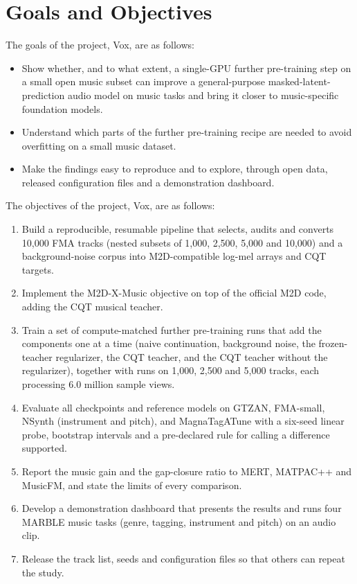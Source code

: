 \documentclass{FastFyp}
\begin{document}
\section{Goals and Objectives}
\label{sec:vision-goals}
The goals of the project, Vox, are as follows:
\begin{itemize}
  \item Show whether, and to what extent, a single-GPU further pre-training step on a small open music subset can improve a general-purpose masked-latent-prediction audio model on music tasks and bring it closer to music-specific foundation models.
  \item Understand which parts of the further pre-training recipe are needed to avoid overfitting on a small music dataset.
  \item Make the findings easy to reproduce and to explore, through open data, released configuration files and a demonstration dashboard.
\end{itemize}
The objectives of the project, Vox, are as follows:
\begin{enumerate}
  \item Build a reproducible, resumable pipeline that selects, audits and converts 10,000 FMA tracks (nested subsets of 1,000, 2,500, 5,000 and 10,000) and a background-noise corpus into M2D-compatible log-mel arrays and CQT targets.
  \item Implement the M2D-X-Music objective on top of the official M2D code, adding the CQT musical teacher.
  \item Train a set of compute-matched further pre-training runs that add the components one at a time (naive continuation, background noise, the frozen-teacher regularizer, the CQT teacher, and the CQT teacher without the regularizer), together with runs on 1,000, 2,500 and 5,000 tracks, each processing 6.0 million sample views.
  \item Evaluate all checkpoints and reference models on GTZAN, FMA-small, NSynth (instrument and pitch), and MagnaTagATune with a six-seed linear probe, bootstrap intervals and a pre-declared rule for calling a difference supported.
  \item Report the music gain and the gap-closure ratio to MERT, MATPAC++ and MusicFM, and state the limits of every comparison.
  \item Develop a demonstration dashboard that presents the results and runs four MARBLE music tasks (genre, tagging, instrument and pitch) on an audio clip.
  \item Release the track list, seeds and configuration files so that others can repeat the study.
\end{enumerate}
\end{document}
